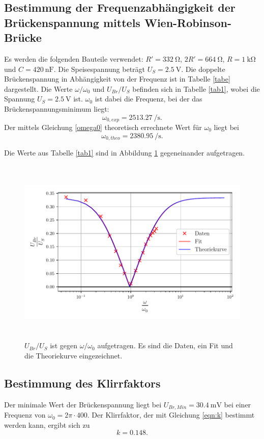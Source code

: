 \subsection{Bestimmung der Frequenzabhängigkeit der Brückenspannung mittels Wien-Robinson-Brücke}
Es werden die folgenden Bauteile verwendet:
$R' = \SI{332}{\ohm}$, $2R' = \SI{664}{\ohm}$, $R = \SI{1}{\kilo\ohm}$
und $C = \SI{420}{\nano\farad}$. Die Speisespannung beträgt $U_S = \SI{2.5}{\volt}$.
Die doppelte Brückenspannung in Abhängigkeit von der Frequenz ist in Tabelle \ref{tabe} dargestellt.
Die Werte $\omega / \omega_0$ und $U_{Br} / U_S$ befinden sich in Tabelle \ref{tab1}, wobei die Spannung $U_S = \SI{2.5}{\volt}$ ist.
$\omega_0$ ist dabei die Frequenz, bei der das Brückenspannungsminimum liegt:
\begin{equation*}
    \omega_{0,exp} = \SI[per-mode=fraction]{2513.27}{\per\second}.
\end{equation*}
 Der mittels Gleichung \eqref{omega0} theoretisch errechnete Wert für $\omega_0$ liegt bei 
 \begin{equation*}
     \omega_{0,theo} = \SI[per-mode=fraction]{2380.95}{\per\second}.
 \end{equation*}


\noindent Die Werte aus Tabelle \ref{tab1} sind in Abbildung \ref{fig:plot} gegeneinander aufgetragen.
\begin{figure}
 \centering
 \includegraphics[width= 13cm, height= 9cm]{build/plot1.pdf}
 \caption{$U_{Br}/U_S$ ist gegen $\omega / \omega_0$ aufgetragen. Es sind die Daten, ein Fit und die
 Theoriekurve eingezeichnet.}
 \label{fig:plot}
\end{figure}

\subsection{Bestimmung des Klirrfaktors}
Der minimale Wert der Brückenspannung liegt bei $U_{Br,Min} = \SI{30.4}{\milli\volt}$ bei einer Frequenz von 
$\omega_0 = 2 \pi \cdot 400$. 
\newline
Der Klirrfaktor, der mit Gleichung \eqref{eqn:k} bestimmt werden kann, ergibt sich zu
\begin{equation*}
    k = \num{0.148}. %
\end{equation*}

